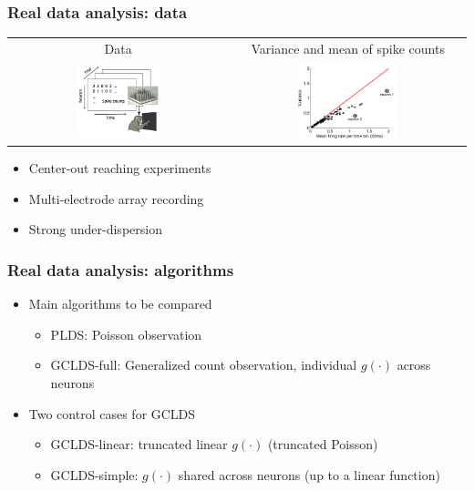 \documentclass[16pt,presentation]{beamer}
\begin{document}
\begin{frame}
\frametitle{Real data analysis: data}
\begin{tabular}{ cc } 
{\small Data} & {\small Variance and mean of spike counts}\\
\includegraphics[width = 0.40\textwidth]{./figs/gclds/fig_monkey.png}&
\includegraphics[width = 0.45\textwidth]{./figs/gclds/fig_var_obs_Move_seq14.pdf}
\end{tabular}
\begin{itemize}
\item Center-out reaching experiments
\item Multi-electrode array recording
\item Strong \alert{under-dispersion}
\end{itemize}
\end{frame}


\begin{frame}
\frametitle{Real data analysis: algorithms}
\begin{itemize}
\item Main algorithms to be compared
\begin{itemize}
\item \alert{PLDS}: Poisson observation
\item \alert{GCLDS-full}: Generalized count observation, individual $g(\cdot)$ across neurons
\end{itemize}
\item Two control cases for GCLDS
\begin{itemize}
\item \alert{GCLDS-linear}: truncated linear $g(\cdot)$ (truncated Poisson)
\item \alert{GCLDS-simple}: $g(\cdot)$ shared across neurons (up to a linear function)
\end{itemize}
\end{itemize}
\end{frame}
\end{document}
